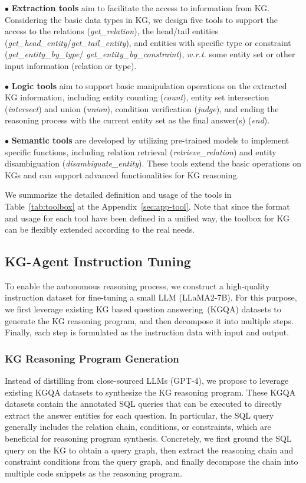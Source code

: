 $\bullet$ \textbf{Extraction tools} aim to facilitate the access to information from KG. 
Considering the basic data types in  KG, we design five tools to support the access to the relations (\emph{get\_relation}), the head/tail entities (\emph{get\_head\_entity}/\emph{get\_tail\_entity}), and entities with specific type or constraint (\emph{get\_entity\_by\_type}/ \emph{get\_entity\_by\_constraint}), \emph{w.r.t.} some entity set or other input information (\eg relation or type).  

$\bullet$ \textbf{Logic tools} aim to 
support basic manipulation operations on the extracted KG information, including entity counting (\emph{count}), entity set intersection (\emph{intersect}) and union (\emph{union}), condition verification (\emph{judge}), and ending the reasoning process with the current entity set as the final answer(s) (\emph{end}). 

$\bullet$ \textbf{Semantic tools}
are developed by utilizing pre-trained models to implement specific functions, including relation retrieval (\emph{retrieve\_relation}) and entity disambiguation (\emph{disambiguate\_entity}). 
These tools extend the basic operations on KGs and can support advanced functionalities for KG reasoning. 

We summarize the detailed definition and usage of the tools in Table~\ref{tab:toolbox} at the Appendix~\ref{sec:app-tool}. Note that since the format and usage for each tool have been defined in a unified way, the toolbox for KG can be flexibly extended according to the real needs.

\subsection{KG-Agent Instruction  Tuning}
\label{sec:tuning}
To enable the autonomous reasoning process, we construct a high-quality instruction dataset for fine-tuning a small LLM (\ie LLaMA2-7B).
For this purpose, we first leverage existing KG based question answering~(KGQA) datasets to generate the KG reasoning program, and then decompose it into multiple steps. Finally, each step is formulated as the instruction data with input and output.

\subsubsection{KG Reasoning Program Generation}\label{sec-KG-RPG}
Instead of distilling from close-sourced LLMs (\eg GPT-4),  we propose to leverage existing KGQA datasets to synthesize the KG reasoning program. 
These KGQA datasets contain the annotated SQL queries that can be executed to directly extract the answer entities for each question. 
In particular, the SQL query generally includes the relation chain, conditions, or constraints, which are beneficial for reasoning program synthesis.  
Concretely, we first ground the SQL query on the KG to obtain a query graph, then extract the reasoning chain and constraint conditions from the query graph, and finally decompose the chain into multiple code snippets as the reasoning program.


